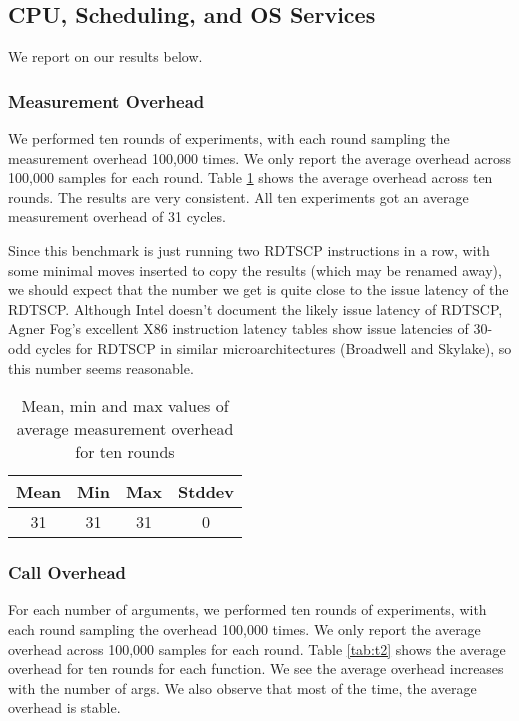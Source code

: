 \subsection{CPU, Scheduling, and OS Services}
We report on our results below.
\subsubsection{Measurement Overhead}
We performed ten rounds of experiments, with each round sampling the measurement overhead 100,000 times. We only report the average overhead across 100,000 samples for each round.
Table \ref{tab:t1} shows the average overhead across ten rounds. 
The results are very consistent.
All ten experiments got an average measurement overhead of 31 cycles.

Since this benchmark is just running two RDTSCP instructions in a row,
with some minimal moves inserted to copy the results (which may be
renamed away), we should expect that the number we get is quite close
to the issue latency of the RDTSCP.
%
Although Intel doesn't document the likely issue latency of RDTSCP,
Agner Fog's excellent X86 instruction latency tables show issue
latencies of 30-odd cycles for RDTSCP in similar microarchitectures
(Broadwell and Skylake), so this number seems reasonable.

\begin{table}[htb]

\caption{Mean, min and max values of average measurement overhead for ten rounds}

    \begin{tabular}{|c|c|c|c|} 
     \hline
     Mean & Min & Max & Stddev\\ 
     \hline
     31 & 31 & 31 & 0\\ 
     \hline
    \end{tabular}
    \label{tab:t1}
\end{table}

\subsubsection{Call Overhead}
For each number of arguments, we performed ten rounds of experiments,
with each round sampling the overhead 100,000 times.
%
We only report the average overhead across 100,000 samples for each
round.
%
Table \ref{tab:t2} shows the average overhead for ten rounds for each
function.
%
We see the average overhead increases with the number of args. We also
observe that most of the time, the average overhead is stable.
%

